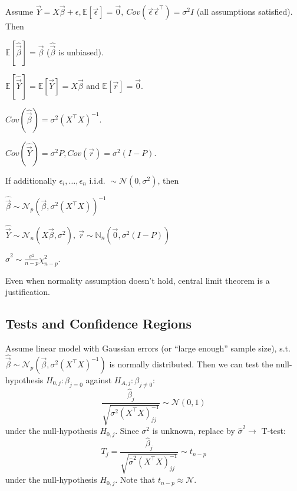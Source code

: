 \begin{notebox}\nospacing{}
  Assume $\vec{Y}=X\vec{\beta} + \epsilon, \mathbb{E}[\vec{\epsilon}]=\vec{0},\ Cov(\vec{\epsilon} \vec{\epsilon}^{\top}) = \sigma^{2}I$ (all assumptions satisfied). Then
  \begin{enumeratenosep}[label=\roman*]
    \item $\mathbb{E}[\hat{\vec{\beta}}] = \vec{\beta}$ ($\hat{\vec{\beta}}$ is unbiased).
    \item $\mathbb{E}[\hat{\vec{Y}}] = \mathbb{E}[\vec{Y}] = X\vec{\beta}$ and $\mathbb{E}[\vec{r}] = \vec{0}$.
    \item $Cov(\hat{\vec{\beta}}) = \sigma^{2}{(X^{\top}X)}^{-1}$.
    \item $Cov(\hat{\vec{Y}}) = \sigma^{2} P, Cov(\vec{r}) = \sigma^{2}(I-P)$.
  \end{enumeratenosep}
  If additionally $\epsilon_{i}, \dots, \epsilon_{n} \text{ i.i.d. } \sim \mathcal{N}(0, \sigma^{2})$, then
  \begin{enumeratenosep}[label=\roman*]
    \item $\hat{\vec{\beta}} \sim \mathcal{N}_{p}{(\vec{\beta}, \sigma^{2}(X^{\top}X))}^{-1}$
    \item $\hat{\vec{Y}} \sim \mathcal{N}_{n}(X\vec{\beta}, \sigma^{2}),\ \vec{r} \sim \mathbb{N}_{n}(\vec{0}, \sigma^{2}(I-P))$
    \item $\hat \sigma^{2} \sim \frac{\sigma^{2}}{n-p}\chi^{2}_{n-p}$.
  \end{enumeratenosep}
  Even when normality assumption doesn't hold, central limit theorem is a justification.
\end{notebox}
\subsection{Tests and Confidence Regions}\label{subsec:tests_and_confidence_regions}
\begin{sectionbox}[T-test]\nospacing{}
  Assume linear model with Gaussian errors (or ``large enough'' sample size), s.t. $\hat{\vec{\beta}} \sim \mathcal{N}_{p}\left(\vec{\beta}, \sigma^{2}{(X^{\top}X)}^{-1}\right)$ is normally distributed.
  Then we can test the null-hypothesis $H_{0,j}: \beta_{j = 0}$ against $H_{A,j}: \beta_{j \neq 0}$:
  \[\frac{\hat \beta_{j}}{\sqrt{\sigma^{2}{{(X^{\top}X)}^{-1}_{jj}}}} \sim \mathcal{N}(0,1)\] under the null-hypothesis $H_{0,j}$. Since $\sigma^{2}$ is unknown, replace by $\hat \sigma^{2} \rightarrow$ T-test:
  \[T_{j} = \frac{\hat \beta_{j}}{\sqrt{\hat \sigma^{2}{{(X^{\top}X)}^{-1}_{jj}}}} \sim t_{n-p}\] under the null-hypothesis $H_{0,j}$. Note that $t_{n-p} \approx \mathcal{N}$.
\end{sectionbox}


